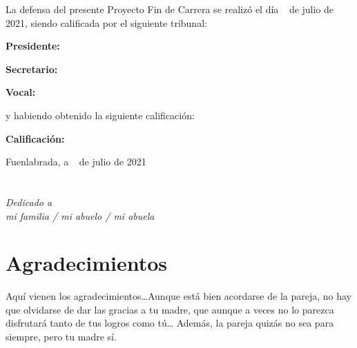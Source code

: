 \documentclass[a4paper, 12pt]{book}
\begin{document}
\vspace{1cm}
La defensa del presente Proyecto Fin de Carrera se realizó el día \qquad$\;\,$ de julio de 2021, siendo calificada por el siguiente tribunal:


\vspace{0.5cm}
\textbf{Presidente:}

\vspace{1.2cm}
\textbf{Secretario:}

\vspace{1.2cm}
\textbf{Vocal:}


\vspace{1.2cm}
y habiendo obtenido la siguiente calificación:

\vspace{1cm}
\textbf{Calificación:}


\vspace{1cm}
\begin{flushright}
Fuenlabrada, a \qquad$\;\,$ de julio de 2021
\end{flushright}


\chapter*{}
\begin{flushright}
\textit{Dedicado a \\
mi familia / mi abuelo / mi abuela}
\end{flushright}


\chapter*{Agradecimientos}
Aquí vienen los agradecimientos\ldots Aunque está bien acordarse de la pareja, no hay que olvidarse de dar las gracias a tu madre, que aunque a veces no lo parezca disfrutará tanto de tus logros como tú\ldots 
Además, la pareja quizás no sea para siempre, pero tu madre sí.

\end{document}
